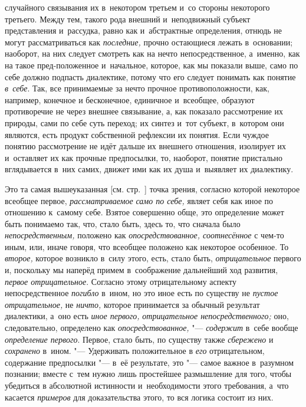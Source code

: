 случайного связывания их в~некотором третьем и~со стороны некоторого
третьего. Между тем, такого рода внешний и~неподвижный субъект
представления и~рассудка, равно как и~абстрактные определения, отнюдь не
могут рассматриваться как {\em последние,} прочно
остающиеся лежать в~основании; наоборот, на них следует
смотреть как на нечто непосредственное, а~именно, как на такое
пред-положенное и~начальное, которое, как мы показали выше, само по себе
должно подпасть диалектике, потому что его следует понимать как понятие
{\em в~себе}. Так, все
принимаемые за нечто прочное противоположности, как, например, конечное и
бесконечное, единичное и~всеобщее, образуют противоречие не через внешнее
связывание, а, как показало рассмотрение их природы, сами по себе суть
переход; их синтез и~тот субъект, в~котором они являются, есть продукт
собственной рефлексии их понятия. Если чуждое понятию рассмотрение не идёт
дальше их внешнего отношения, изолирует их и~оставляет их как прочные
предпосылки, то, наоборот, понятие пристально вглядывается в~них самих,
движет ими как их душа и~выявляет их диалектику.

Это та самая вышеуказанная [см. стр.~\pageref{bkm:bmpg224a}]
точка зрения, согласно которой некоторое всеобщее первое,
{\em рассматриваемое} {\em само по себе,} являет
себя как иное по отношению к~самому себе. Взятое совершенно обще, это
определение может быть понимаемо так, что, стало быть, здесь то, что
сначала было {\em непосредственным,}
положено как {\em опосредствованное, соотнесённое} с
чем-то иным, или, иначе говоря, что всеобщее положено как некоторое
особенное. То {\em второе,}
которое возникло в~силу этого, есть, стало быть, {\em отрицательное}
первого и, поскольку мы наперёд примем в~соображение
дальнейший ход развития, {\em первое
отрицательное}. Согласно этому отрицательному аспекту
непосредственное {\em погибло}
в~ином, но это иное есть по существу не
{\em пустое отрицательное,} не {\em ничто,}
которое принимается за обычный результат диалектики, а~оно
есть {\em иное первого,}
{\em отрицательное непосредственного;} оно, следовательно, определено как
{\em опосредствованное,} "--- {\em содержит} в~себе
вообще {\em определение первого}. Первое, стало быть, по существу также
{\em сбережено} и {\em сохранено} в~ином. "--- Удерживать положительное в
{\em его} отрицательном, содержание предпосылки "--- в~её
результате,
это "--- самое важное в~разумном познании; вместе
с~тем нужно лишь простейшее размышление для того, чтобы убедиться в
абсолютной истинности и~необходимости этого требования, а~что касается
{\em примеров} для доказательства этого, то вся логика состоит из них.

